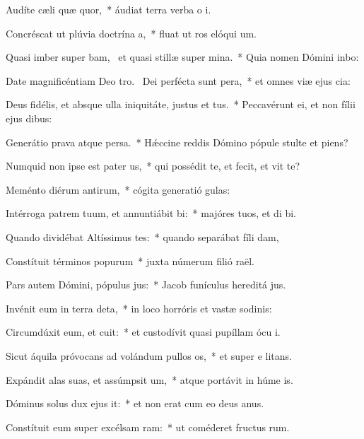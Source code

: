 \item Audíte cæli quæ quor,~* áudiat terra verba o i.
\item Concréscat ut plúvia doctrína a,~* fluat ut ros elóqui um.
\item Quasi imber super bam,~\pscross{} et quasi stillæ super mina.~* Quia nomen Dómini inbo:
\item Date magnificéntiam Deo tro.~\pscross{} Dei perfécta sunt pera,~* et omnes viæ ejus cia:
\item Deus fidélis, et absque ulla iniquitáte, justus et tus.~* Peccavérunt ei, et non fílii ejus  dibus:
\item Generátio prava atque persa.~* Hǽccine reddis Dómino pópule stulte et piens?
\item Numquid non ipse est pater us,~* qui possédit te, et fecit, et vit te?
\item Meménto diérum antirum,~* cógita generatió gulas:
\item Intérroga patrem tuum, et annuntiábit bi:~* majóres tuos, et di bi.
\item Quando dividébat Altíssimus tes:~* quando separábat fíli dam,
\item Constítuit términos popurum~* juxta númerum filió raël.
\item Pars autem Dómini, pópulus jus:~* Jacob funículus hereditá jus.
\item Invénit eum in terra deta,~* in loco horróris et vastæ sodinis:
\item Circumdúxit eum, et cuit:~* et custodívit quasi pupíllam ócu i.
\item Sicut áquila próvocans ad volándum pullos os,~* et super e litans.
\item Expándit alas suas, et assúmpsit um,~* atque portávit in húme is.
\item Dóminus solus dux ejus it:~* et non erat cum eo deus anus.
\item Constítuit eum super excélsam ram:~* ut coméderet fructus rum.
